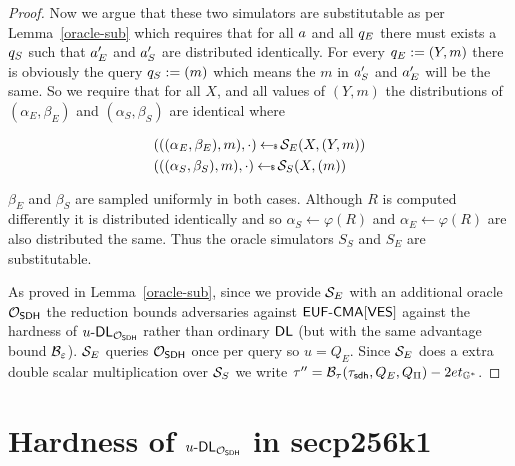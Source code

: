 \begin{proof}
  Now we argue that these two simulators are substitutable as per Lemma~\ref{oracle-sub} which requires that for all $a$ and all $q_E$ there must exists a $q_S$ such that $a'_E$ and $a'_S$ are distributed identically.
  For every $q_E := (Y, m)$ there is obviously the query $q_S := (m)$ which means the $m$ in  $a'_S$ and $a'_E$ will be the same.
  So we require that for all $X$, and all values of $(Y,m)$ the distributions of $(\alpha_E,\beta_E)$ and $(\alpha_S,\beta_S)$ are identical where

  \begin{align*}
    & (((\alpha_E,\beta_E), m), \cdot) \hskip2.3pt{\gets\!\!\mbox{\tiny${\$}$\normalsize}}\, \mathcal{S}_E(X,(Y,m)) \\
    & (((\alpha_S,\beta_S), m), \cdot) \hskip2.3pt{\gets\!\!\mbox{\tiny${\$}$\normalsize}}\, \mathcal{S}_S(X,(m))
  \end{align*}

  $\beta_E$ and $\beta_S$ are sampled uniformly in both cases.
  Although $R$ is computed differently it is distributed identically and so $\alpha_S \gets \varphi(R)$ and $\alpha_E \gets \varphi(R)$ are also distributed the same.
  Thus the oracle simulators $S_S$ and $S_E$ are substitutable.

  As proved in Lemma~\ref{oracle-sub}, since we provide $\mathcal{S}_E$ with an additional oracle $\mathcal{O}_{\textsf{SDH}}$ the reduction bounds adversaries against $\textsf{EUF-CMA}[\textsf{VES}]$ against the hardness of $u\text{-}\textsf{DL}_{\mathcal{O}_{\textsf{SDH}}}$ rather than ordinary $\textsf{DL}$ (but with the same advantage bound $\mathcal{B}_\varepsilon$).
  $\mathcal{S}_E$ queries $\mathcal{O}_{\textsf{SDH}}$ once per query so $u = Q_E$.
  Since $\mathcal{S}_E$ does a extra double scalar multiplication over $\mathcal{S}_S$ we write $\tau'' = \mathcal{B}_\tau(\tau_{\textsf{sdh}},Q_E, Q_{\Pi}) -  2et_{\mathbb{G}^*}$.

\end{proof}

\section{Hardness of $u\text{-}\textsf{DL}_{\mathcal{O}_{\textsf{SDH}}}$ in secp256k1}
\label{secp-qdlsdh}

